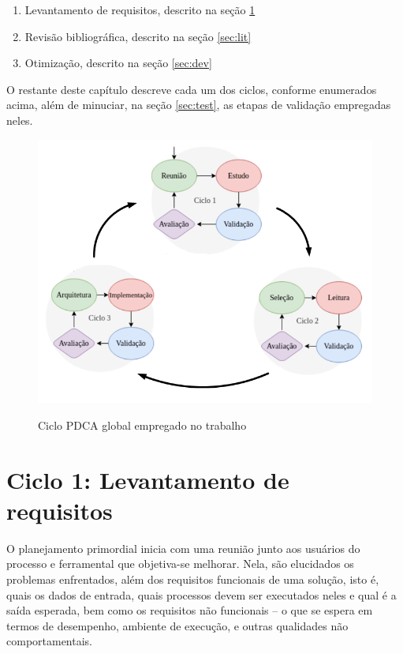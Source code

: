 \documentclass[cic,tc]{iiufrgs}
\begin{document}
\begin{enumerate}
    \item Levantamento de requisitos, descrito na seção \ref{sec:plan}
    \item Revisão bibliográfica, descrito na seção \ref{sec:lit}
    \item Otimização, descrito na seção \ref{sec:dev}
\end{enumerate}

O restante deste capítulo descreve cada um dos ciclos, conforme enumerados
acima, além de minuciar, na seção \ref{sec:test}, as etapas de validação
empregadas neles.

\begin{figure}[H] \caption{Ciclo PDCA global empregado no trabalho} \begin{center}
\includegraphics[width=0.85\linewidth]{img/pdca_global.png} \end{center}
 \label{fig:pdca_global} \end{figure}

\section{Ciclo 1: Levantamento de requisitos}
\label{sec:plan}

O planejamento primordial inicia com uma reunião junto aos usuários do processo
e ferramental que objetiva-se melhorar. Nela, são elucidados os problemas
enfrentados, além dos requisitos funcionais de uma solução, isto é, quais os
dados de entrada, quais processos devem ser executados neles e qual é a saída
esperada, bem como os requisitos não funcionais -- o que se espera em termos de
desempenho, ambiente de execução, e outras qualidades não comportamentais. 
\end{document}
